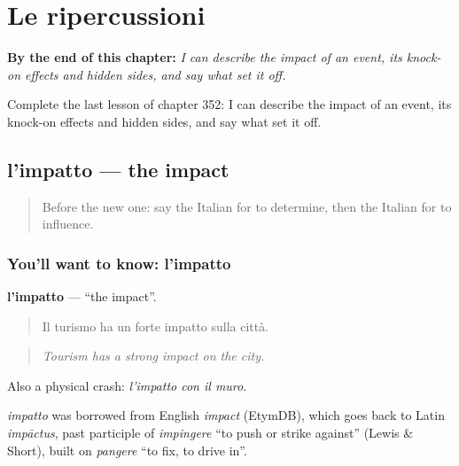 
\chapter{Le ripercussioni}
\label{ch:it-le-ripercussioni}

\begin{chapteropening}
\textbf{By the end of this chapter:} \emph{I can describe the impact of an event, its knock-on effects and hidden sides, and say what set it off.}

Complete the last lesson of chapter 352: I can describe the impact of an event, its knock-on effects and hidden sides, and say what set it off.
\end{chapteropening}

\section[l'impatto]{l'impatto — the impact}

\label{lesson:IT-C352-impatto}



\begin{quote}
Before the new one: say the Italian for to determine, then the Italian for to influence.
\end{quote}

\subsection*{You'll want to know: l'impatto}
\textbf{l'impatto} — \textquotedblleft{}the impact\textquotedblright{}.

\begin{quote}
Il turismo ha un forte impatto sulla città.
\end{quote}

\begin{quote}
\emph{Tourism has a strong impact on the city.}
\end{quote}

Also a physical crash: \emph{l'impatto con il muro}.

\begin{cousinweb}
\emph{impatto} was borrowed from English \emph{impact} (EtymDB), which goes back to Latin \emph{impāctus}, past participle of \emph{impingere} \textquotedblleft{}to push or strike against\textquotedblright{} (Lewis \& Short), built on \emph{pangere} \textquotedblleft{}to fix, to drive in\textquotedblright{}.
\end{cousinweb}

